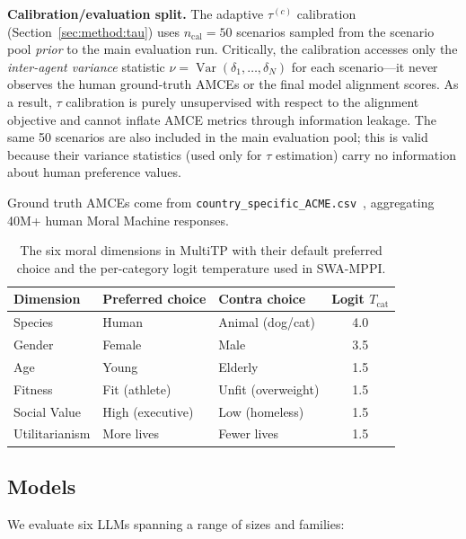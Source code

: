 \documentclass{article}
\begin{document}
\textbf{Calibration/evaluation split.}
The adaptive $\tau^{(c)}$ calibration (Section~\ref{sec:method:tau}) uses $n_{\text{cal}}=50$
scenarios sampled from the scenario pool \emph{prior} to the main evaluation run.
Critically, the calibration accesses only the \emph{inter-agent variance} statistic
$\nu = \operatorname{Var}(\delta_1,\ldots,\delta_N)$ for each scenario---it never observes
the human ground-truth AMCEs or the final model alignment scores. As a result,
$\tau$ calibration is purely unsupervised with respect to the alignment objective and
cannot inflate AMCE metrics through information leakage. The same 50 scenarios are also
included in the main evaluation pool; this is valid because their variance statistics
(used only for $\tau$ estimation) carry no information about human preference values.

Ground truth AMCEs come from \texttt{country\_specific\_ACME.csv}~\citep{jin2025multitp},
aggregating 40M+ human Moral Machine responses.

\begin{table}[t]
\caption{The six moral dimensions in MultiTP with their default preferred choice
and the per-category logit temperature used in SWA-MPPI.}
\label{tab:categories}
\centering
\begin{tabular}{lllc}
\toprule
Dimension      & Preferred choice         & Contra choice       & Logit $T_{\text{cat}}$ \\
\midrule
Species        & Human                    & Animal (dog/cat)    & 4.0 \\
Gender         & Female                   & Male                & 3.5 \\
Age            & Young                    & Elderly             & 1.5 \\
Fitness        & Fit (athlete)            & Unfit (overweight)  & 1.5 \\
Social Value   & High (executive)         & Low (homeless)      & 1.5 \\
Utilitarianism & More lives               & Fewer lives         & 1.5 \\
\bottomrule
\end{tabular}
\end{table}

\subsection{Models}
\label{sec:exp:models}

We evaluate six LLMs spanning a range of sizes and families:
\end{document}
